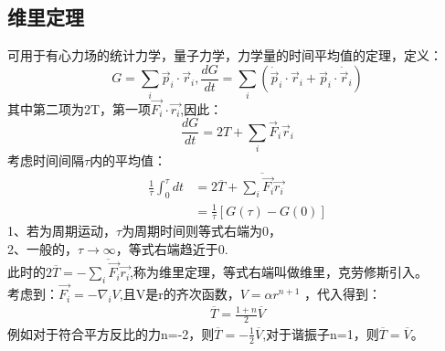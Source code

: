 \documentclass[UTF8,10pt]{article}
\begin{document}
\subsection{维里定理}
可用于有心力场的统计力学，量子力学，力学量的时间平均值的定理，定义：
$$
    G=\sum_i{\vec{p}_i\cdot \vec{r}_i, \frac{dG}{dt}=\sum_i{\left( \dot{\vec{p}}_i\cdot \vec{r}_i+\vec{p}_i\cdot \dot{\vec{r}}_i \right)}}
$$
其中第二项为2T，第一项$\vec{F_i}\cdot \vec{r_i}$,因此：
$$
    \frac{dG}{dt}=2T+\sum_i{\vec{F}_i\vec{r}_i}
$$
考虑时间间隔$\tau$内的平均值：
\begin{align*}
    \frac{1}{\tau}\int_{0}^{\tau} dt & = 2\overline{T}+\overline{\sum_i \vec{F_i}\vec{r_i}} \\
                                     & =\frac{1}{\tau}[G(\tau)-G(0)]
\end{align*}
1、若为周期运动，$\tau$为周期时间则等式右端为0，\\
2、一般的，$\tau\rightarrow \infty$，等式右端趋近于0.\\
此时的$2\overline{T}=-\overline{\sum_i \vec{F_i}\vec{r_i}}$,称为维里定理，等式右端叫做维里，克劳修斯引入。
\\考虑到：$\vec{F_i}=-\nabla_i V$,且V是r的齐次函数，$V=\alpha r^{n+1}$
，代入得到：
\begin{align*}
    \overline{T}=\frac{1+n}{2}\overline{V}
\end{align*}
例如对于符合平方反比的力n=-2，则$\overline{T}=-\frac{1}{2}\overline{V}$,对于谐振子n=1，则$\overline{T}=\overline{V}$。
\end{document}
